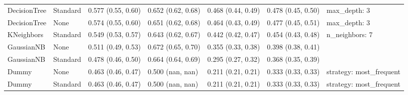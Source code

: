 \begin{tabular}{lllllll}
DecisionTree & Standard & 0.577 (0.55, 0.60) & 0.652 (0.62, 0.68) & 0.468 (0.44, 0.49) & 0.478 (0.45, 0.50) & {{max\_depth: 3}} \\
DecisionTree & None & 0.574 (0.55, 0.60) & 0.651 (0.62, 0.68) & 0.464 (0.43, 0.49) & 0.477 (0.45, 0.51) & {{max\_depth: 3}} \\
KNeighbors & Standard & 0.549 (0.53, 0.57) & 0.643 (0.62, 0.67) & 0.442 (0.42, 0.47) & 0.454 (0.43, 0.48) & {{n\_neighbors: 7}} \\
GaussianNB & None & 0.511 (0.49, 0.53) & 0.672 (0.65, 0.70) & 0.355 (0.33, 0.38) & 0.398 (0.38, 0.41) & {{}} \\
GaussianNB & Standard & 0.478 (0.46, 0.50) & 0.664 (0.64, 0.69) & 0.295 (0.27, 0.32) & 0.368 (0.35, 0.39) & {{}} \\
Dummy & None & 0.463 (0.46, 0.47) & 0.500 (nan, nan) & 0.211 (0.21, 0.21) & 0.333 (0.33, 0.33) & {{strategy: most_frequent}} \\
Dummy & Standard & 0.463 (0.46, 0.47) & 0.500 (nan, nan) & 0.211 (0.21, 0.21) & 0.333 (0.33, 0.33) & {{strategy: most_frequent}} \\
\bottomrule
\end{tabular}
